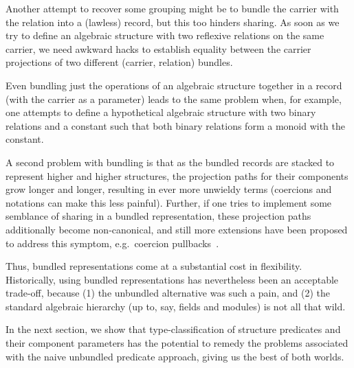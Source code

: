 \documentclass[a4paper,10pt,runningheads]{llncs}
\begin{document}
Another attempt to recover some grouping might be to bundle the carrier with the relation into a (lawless) record, but this too hinders sharing. As soon as we try to define an algebraic structure with two reflexive relations on the same carrier, we need awkward hacks to establish equality between the carrier projections of two different (carrier, relation) bundles.

Even bundling just the operations of an algebraic structure together in a record (with the carrier as a parameter) leads to the same problem when, for example, one attempts to define a hypothetical algebraic structure with two binary relations and a constant such that both binary relations form a monoid with the constant.

A second problem with bundling is that as the bundled records are stacked to represent higher and higher structures, the projection paths for their components grow longer and longer, resulting in ever more unwieldy terms (coercions and notations can make this less painful). Further, if one tries to implement some semblance of sharing in a bundled representation, these projection paths additionally become non-canonical, and still more extensions have been proposed to address this symptom, e.g.\ coercion pullbacks~\cite{Hints}.

Thus, bundled representations come at a substantial cost in flexibility. Historically, using bundled representations has nevertheless been an acceptable trade-off, because (1) the unbundled alternative was such a pain, and (2) the standard algebraic hierarchy (up to, say, fields and modules) is not all that wild.

In the next section, we show that type-classification of structure predicates and their component parameters has the potential to remedy the problems associated with the naive unbundled predicate approach, giving us the best of both worlds.


\end{document}
